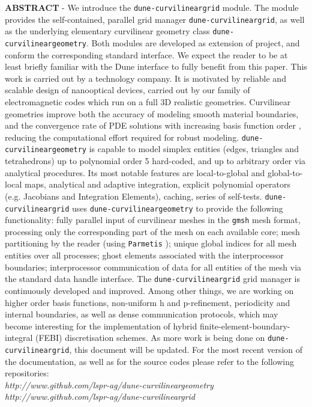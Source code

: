 \documentclass[a4paper,11pt]{article}
\newcommand{\citeParMetis}{\cite{schloegel+2002, lasalle+2013} }
\newcommand{\citeGMSH}{\cite{geuzaine+2009} }
\newcommand{\citeDune}{\cite{bastian+2008} }
\begin{document}
\begin{titlepage}
\noindent \textbf{\textsc{ABSTRACT}} - We introduce the \texttt{dune-curvilineargrid} module. The module provides the self-contained, parallel grid manager \texttt{dune-curvilineargrid}, as well as the underlying elementary curvilinear geometry class \texttt{dune-curvilineargeometry}. Both modules are developed as extension of  \citeDune project, and conform the corresponding standard interface. We expect the reader to be at least briefly familiar with the Dune interface to fully benefit from this paper.
This work is carried out by a technology company. It is motivated by reliable and scalable design of nanooptical devices, carried out by our family of electromagnetic codes which run on a full 3D realistic geometries. Curvilinear geometries improve both the accuracy of modeling smooth material boundaries, and the convergence rate of PDE solutions with increasing basis function order \cite{fahs2011}, reducing the computational effort required for robust modeling.
\texttt{dune-curvilineargeometry} is capable to model simplex entities (edges, triangles and tetrahedrons) up to polynomial order 5 hard-coded, and up to arbitrary order via analytical procedures. Its most notable features are local-to-global and global-to-local maps, analytical and adaptive integration, explicit polynomial operators (e.g. Jacobians and Integration Elements), caching, series of self-tests.
\texttt{dune-curvilineargrid} uses \texttt{dune-curvilineargeometry} to provide the following functionality: fully parallel input of curvilinear meshes in the \texttt{gmsh}\citeGMSH mesh format, processing only the corresponding part of the mesh on each available core; mesh partitioning by the reader (using \texttt{Parmetis} \citeParMetis); unique global indices for all mesh entities over all processes; ghost elements associated with the interprocessor boundaries; interprocessor communication of data for all entities of the mesh via the standard  data handle interface.
The \texttt{dune-curvilineargrid} grid manager is continuously developed and improved. Among other things, we are working on higher order basis functions, non-uniform h and p-refinement, periodicity and internal boundaries, as well as dense communication protocols, which may become interesting for the implementation of hybrid finite-element-boundary-integral (FEBI) discretisation schemes.
As more work is being done on \texttt{dune-curvilineargrid}, this document will be updated. For the most recent version of the documentation, as well as for the source codes please refer to the following repositories: \\

\noindent
\textit{http://www.github.com/lspr-ag/dune-curvilineargeometry} \\
\textit{http://www.github.com/lspr-ag/dune-curvilineargrid}




\end{titlepage}
\end{document}
